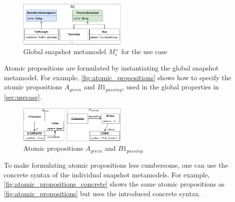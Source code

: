 \documentclass{jot}
\begin{document}


\begin{figure}[h]
    \centering
    \includegraphics[width=0.475\textwidth]{figures/global_s_model.pdf}
    \caption{Global snapshot metamodel $M_s^+$ for the use case}
    \label{fig:global_snapshot_model}
\end{figure}

Atomic propositions are formulated by instantiating the global snapshot metamodel. 
For example, \autoref{fig:atomic_propositions} shows how to specify the atomic propositions $A_{green}$ and $B1_{passing}$, used in the global properties in \autoref{sec:usecase}.

\begin{figure}[h]
    \centering
    \includegraphics[width=0.475\textwidth]{figures/atomic_props.pdf}
    \caption{Atomic propositions $A_{green}$ and $B1_{passing}$}
    \label{fig:atomic_propositions}
\end{figure}

To make formulating atomic propositions less cumbersome, one can use the concrete syntax of the individual snapshot metamodels.
For example, \autoref{fig:atomic_propositions_concrete} shows the same atomic propositions as \autoref{fig:atomic_propositions} but uses the introduced concrete syntax.
\end{document}
